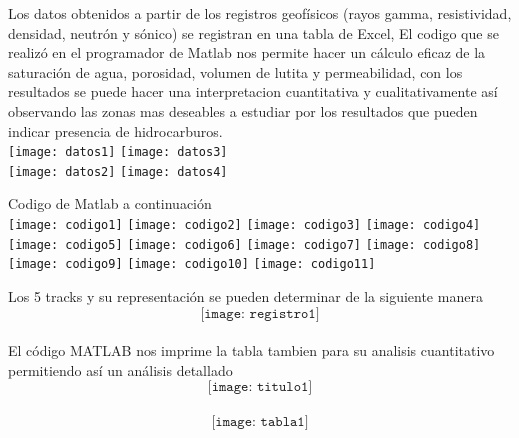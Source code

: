 \documentclass[10pt,a4paper]{report}
\begin{document}
  Los datos obtenidos a partir de los registros geofísicos (rayos gamma, resistividad, densidad, neutrón y sónico) se registran
 en una tabla de Excel, El codigo que se realizó en el programador de Matlab nos permite hacer un cálculo eficaz de la saturación de agua, porosidad, volumen de lutita y permeabilidad, con los resultados se puede hacer una interpretacion cuantitativa y cualitativamente  así observando las zonas mas deseables a estudiar por los resultados que pueden indicar presencia de hidrocarburos. 
\\ \texttt{[image: datos1]} 
 \texttt{[image: datos3]} 
\\ \texttt{[image: datos2]} 
 \texttt{[image: datos4]} 









\newpage
Codigo de Matlab a continuación
\\ \texttt{[image: codigo1]} 
\newpage
\texttt{[image: codigo2]}
\newpage
\texttt{[image: codigo3]}
\newpage
\texttt{[image: codigo4]}
\newpage
\texttt{[image: codigo5]}
\newpage
\texttt{[image: codigo6]}
\newpage
\texttt{[image: codigo7]}
\newpage
\texttt{[image: codigo8]}
\newpage
\texttt{[image: codigo9]}
\newpage
\texttt{[image: codigo10]}
\newpage
\texttt{[image: codigo11]}






 
\newpage
Los 5 tracks y su representación se pueden determinar de la siguiente manera
\\ $$\texttt{[image: registro1]}$$
\\El código MATLAB nos imprime la tabla tambien para su analisis cuantitativo permitiendo así un análisis detallado
\\ $$\texttt{[image: titulo1]}$$
\\ $$\texttt{[image: tabla1]}$$
\end{document}
